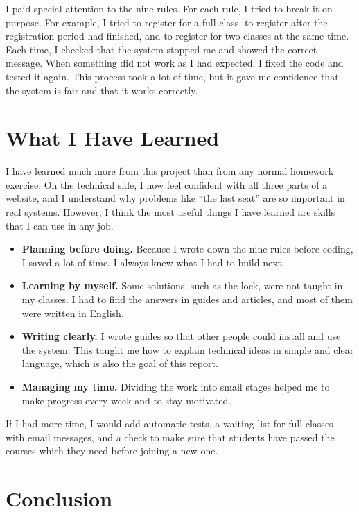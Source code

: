 \documentclass[12pt,a4paper]{article}
\begin{document}
I paid special attention to the nine rules. For each rule, I tried to break it
on purpose. For example, I tried to register for a full class, to register
after the registration period had finished, and to register for two classes
at the same time. Each time, I checked that the system stopped me and showed
the correct message. When something did not work as I had expected, I fixed
the code and tested it again. This process took a lot of time, but it gave me
confidence that the system is fair and that it works correctly.

\section{What I Have Learned}

I have learned much more from this project than from any normal homework
exercise. On the technical side, I now feel confident with all three parts of
a website, and I understand why problems like ``the last seat'' are so
important in real systems. However, I think the most useful things I have
learned are skills that I can use in any job.

\begin{itemize}[leftmargin=1.6em]
  \item \textbf{Planning before doing.} Because I wrote down the nine rules
        before coding, I saved a lot of time. I always knew what I had to
        build next.
  \item \textbf{Learning by myself.} Some solutions, such as the lock, were not
        taught in my classes. I had to find the answers in guides and articles,
        and most of them were written in English.
  \item \textbf{Writing clearly.} I wrote guides so that other people could
        install and use the system. This taught me how to explain technical
        ideas in simple and clear language, which is also the goal of this
        report.
  \item \textbf{Managing my time.} Dividing the work into small stages helped
        me to make progress every week and to stay motivated.
\end{itemize}

If I had more time, I would add automatic tests, a waiting list for full
classes with email messages, and a check to make sure that students have
passed the courses which they need before joining a new one.

\section{Conclusion}
\end{document}
